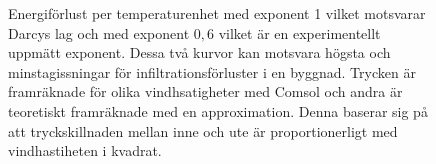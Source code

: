 \begin{figure}[hpbt]
\centering
{}
\vspace{5mm}

\caption{Energiförlust per temperaturenhet med exponent 1 vilket motsvarar
Darcys lag och med exponent $0,6$ vilket är en experimentellt uppmätt
exponent. Dessa två kurvor kan motsvara högsta och minstagissningar för
infiltrationsförluster i en byggnad. Trycken är framräknade för olika
vindhsatigheter med Comsol och andra är teoretiskt framräknade med en approximation.
Denna baserar sig på att tryckskillnaden mellan inne och ute är proportionerligt
med vindhastiheten i kvadrat.}
\end{figure}
